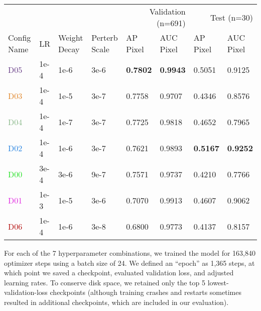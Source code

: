 \begin{table*}[t]
\ifwacv \else \VitResultCaption \fi
\centering
\begin{tabular}{llllllll}
\toprule
            \multicolumn{4}{l}{} & \multicolumn{2}{r}{Validation (n=691)} & \multicolumn{2}{r}{Test (n=30)} \\
Config Name  &   LR & Weight Decay & Perterb Scale & \makecell{AP\\Pixel} & \makecell{AUC\\Pixel} &  \makecell{AP\\Pixel} &  \makecell{AUC\\Pixel} \\
\midrule
        \textcolor[HTML]{623682}{D05} & 1e-4 &   1e-6 &  3e-6 & \textbf{0.7802} & \textbf{0.9943} &          0.5051 &          0.9125 \\
        \textcolor[HTML]{df8020}{D03} & 1e-4 &   1e-5 &  3e-7 &          0.7758 &          0.9707 &          0.4346 &          0.8576 \\
        \textcolor[HTML]{87b787}{D04} & 1e-4 &   1e-7 &  3e-7 &          0.7725 &          0.9818 &          0.4652 &          0.7965 \\
        \textcolor[HTML]{207fdf}{D02} & 1e-4 &   1e-6 &  3e-7 &          0.7621 &          0.9893 & \textbf{0.5167} & \textbf{0.9252} \\
        \textcolor[HTML]{20df20}{D00} & 3e-4 &   3e-6 &  9e-7 &          0.7571 &          0.9737 &          0.4210 &          0.7766 \\
        \textcolor[HTML]{df20df}{D01} & 1e-3 &   1e-5 &  3e-6 &          0.7070 &          0.9913 &          0.4607 &          0.9062 \\
        \textcolor[HTML]{b00403}{D06} & 1e-4 &   1e-6 &  3e-8 &          0.6800 &          0.9773 &          0.4137 &          0.8157 \\
        
\bottomrule
\end{tabular}
\ifwacv \VitResultCaption \fi
\end{table*}

\begin{comment}
    SeeAlso:
    ~/code/shitspotter/experiments/geowatch-experiments/run_pixel_eval_on_vali_pipeline.sh
    python ~/code/shitspotter/dev/poc/estimate_train_resources.py
\end{comment}

For each of the 7 hyperparameter combinations, we trained the model for 163,840 optimizer steps using a
  batch size of 24.
We defined an ``epoch'' as 1,365 steps, at which point we saved a checkpoint, evaluated validation loss, and
  adjusted learning rates.
To conserve disk space, we retained only the top 5 lowest-validation-loss checkpoints (although training
  crashes and restarts sometimes resulted in additional checkpoints, which are included in our evaluation).

